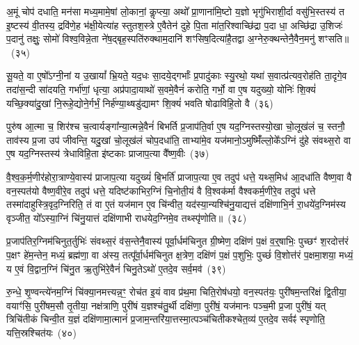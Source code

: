 अ॒मूं चोप॑ दधाति॒ मन॑सा मध्य॒मामे॒षां लो॒कानां॒ कॢप्त्या॒ अथो᳚ प्रा॒णाना॑मि॒ष्टो य॒ज्ञो भृगु॑भिराशी॒र्दा वसु॑भि॒स्तस्य॑ त इ॒ष्टस्य॑ वी॒तस्य॒ द्रवि॑णे॒ह भ॑क्षी॒येत्या॑ह स्तुतश॒स्त्रे ए॒वैतेन॑ दुहे पि॒ता मा॑त॒रिश्वाच्छि॑द्रा प॒दा धा॒ अच्छि॑द्रा उ॒शिजः॑ प॒दानु॑ तक्षुः॒ सोमो॑ विश्व॒विन्ने॒ता ने॑ष॒द्बृह॒स्पति॑रुक्थाम॒दानि॑ शꣳसिष॒दित्या॑है॒तद्वा अ॒ग्नेरु॒क्थन्तेनै॒वैन॒मनु॑ शꣳसति॥~(३५)

{\anuvakamend[{मि॒नु॒यात्तृ॒तीयं॑ चिन्वा॒नस्त्रियं॒ पौत्र॑श्च॒ वै स॒प्तद॑श च}]}%

सू॒यते॒ वा ए॒षो᳚\-ऽग्नी॒नां य उ॒खायां᳚ भ्रि॒यते॒ यद॒धः सा॒दये॒द्गर्भाः᳚ प्र॒पादु॑काः स्यु॒रथो॒ यथा॑ स॒वात्प्र॑त्यव॒रोह॑ति ता॒दृगे॒व तदा॑स॒न्दी सा॑दयति॒ गर्भा॑णां॒ धृत्या॒ अप्र॑पादा॒याथो॑ स॒वमे॒वैनं॑ करोति॒ गर्भो॒ वा ए॒ष यदुख्यो॒ योनिः॑ शि॒क्यं॑ यच्छि॒क्या॑दु॒खां नि॒रूहे॒द्योने॒र्गर्भं॒ निर्\mbox{}ह॑ण्या॒थ्षडु॑द्यामꣳ शि॒क्यं॑ भवति षोढाविहि॒तो वै~(३६)

पुरु॑ष आ॒त्मा च॒ शिर॑श्च च॒त्वार्यङ्गा᳚न्या॒त्मन्ने॒वैनं॑ बिभर्ति प्र॒जा\-प॑ति॒र्वा ए॒ष यद॒ग्निस्तस्यो॒खा चो॒लूख॑लं च॒ स्तनौ॒ ताव॑स्य प्र॒जा उप॑ जीवन्ति॒ यदु॒खां चो॒लूख॑लं चोप॒दधा॑ति॒ ताभ्या॑मे॒व यज॑मानो॒\-ऽमुष्मिँ॑ल्लो॒के᳚\-ऽग्निं दु॑हे संवथ्स॒रो वा ए॒ष यद॒ग्निस्तस्य॑ त्रेधाविहि॒ता इ॑ष्टकाः प्राजाप॒त्या वै᳚ष्ण॒वीः~(३७)

वै॒श्व॒क॒र्म॒णीर॑होरा॒त्राण्ये॒वास्य॑ प्राजाप॒त्या यदुख्यं॑ बि॒भर्ति॑ प्राजाप॒त्या ए॒व तदुप॑ धत्ते॒ यथ्स॒मिध॑ आ॒दधा॑ति वैष्ण॒वा वै वन॒स्पत॑यो वैष्ण॒वीरे॒व तदुप॑ धत्ते॒ यदिष्ट॑काभिर॒ग्निं चि॒नोती॒यं वै वि॒श्वक॑र्मा वैश्वकर्म॒णीरे॒व तदुप॑ धत्ते तस्मा॑दाहुस्त्रि॒वृद॒ग्निरिति॒ तं वा ए॒तं यज॑मान ए॒व चि॑न्वीत॒ यद॑स्या॒न्यश्चि॑नु॒याद्यत्तं दक्षि॑णाभि॒र्न रा॒धये॑द॒ग्निम॑स्य वृञ्जीत॒ यो᳚\-ऽस्या॒ग्निं चि॑नु॒यात्तं दक्षि॑णाभी राधयेद॒ग्निमे॒व तथ्स्पृ॑णोति॥~(३८)

{\anuvakamend[{षो॒ढा॒वि॒हि॒तो वै वै᳚ष्ण॒वीर॒न्यो विꣳ॑श॒तिश्च॑}]}%

प्र॒जा\-प॑तिर॒ग्निम॑चिनुत॒र्तुभिः॑ संवथ्स॒रं व॑स॒न्तेनै॒वास्य॑ पूर्वा॒र्धम॑चिनुत ग्री॒ष्मेण॒ दक्षि॑णं प॒क्षं व॒र्॒\mbox{}षाभिः॒ पुच्छꣳ॑ श॒रदोत्त॑रं प॒क्षꣳ हे॑म॒न्तेन॒ मध्यं॒ ब्रह्म॑णा॒ वा अ॑स्य॒ तत्पू᳚र्वा॒र्धम॑चिनुत क्ष॒त्रेण॒ दक्षि॑णं प॒क्षं प॒शुभिः॒ पुच्छं॑ वि॒शोत्त॑रं प॒क्षमा॒शया॒ मध्यं॒ य ए॒वं वि॒द्वान॒ग्निं चि॑नु॒त ऋ॒तुभि॑रे॒वैनं॑ चिनु॒ते\-ऽथो॑ ए॒तदे॒व सर्व॒मव॑~(३९)

रु॒न्धे॒ शृ॒ण्वन्त्ये॑नम॒ग्निं चि॑क्या॒नमत्त्यन्न॒ꣳ॒ रोच॑त इ॒यं वाव प्र॑थ॒मा चिति॒रोष॑धयो॒ वन॒स्पत॑यः॒ पुरी॑षम॒न्तरि॑क्षं द्वि॒तीया॒ वयाꣳ॑सि॒ पुरी॑षम॒सौ तृ॒तीया॒ नक्ष॑त्राणि॒ पुरी॑षं य॒ज्ञश्च॑तु॒र्थी दक्षि॑णा॒ पुरी॑षं॒ यज॑मानः पञ्च॒मी प्र॒जा पुरी॑षं॒ यत् त्रिचि॑तीकं चिन्वी॒त य॒ज्ञं दक्षि॑णामा॒त्मानं॑ प्र॒जाम॒न्तरि॑या॒त्तस्मा॒त्पञ्च॑चितीकश्चेत॒व्य॑ ए॒तदे॒व सर्वꣴ॑ स्पृणोति॒ यत्ति॒स्रश्चित॑यः~(४०)

